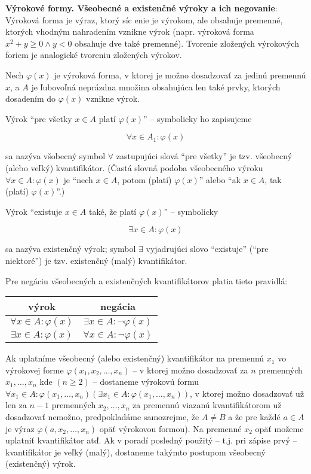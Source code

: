\textbf{Výrokové formy. Všeobecné a existenčné výroky a ich negovanie}:
Výroková forma je výraz, ktorý síc enie je výrokom, ale obsahuje premenné,
ktorých vhodným nahradením vznikne výrok (napr. výroková forma $x^2 + y \geq 0
\land y < 0$ obsahuje dve také premenné). Tvorenie zložených výrokových foriem
je analogické tvoreniu zložených výrokov.

Nech $\varphi (x)$ je výroková forma, v ktorej je možno dosadzovať za jedinú
premennú $x$, a $A$ je ľubovoľná neprázdna množina obsahujúca len také prvky,
ktorých dosadením do $\varphi (x)$ vznikne výrok.

Výrok \enquote{pre všetky $x \in A$ platí $\varphi (x)$} -- symbolicky ho zapisujeme

$$\forall x \in A_1: \varphi (x)$$

sa nazýva všobecný symbol $\forall$ zastupujúci slová \enquote{pre všetky} je
tzv. všeobecný (alebo veľký) kvantifikátor. (Častá slovná podoba všeobecného
výroku $\forall x \in A : \varphi (x)$ je \enquote{nech $x \in A$, potom
(platí) $\varphi (x)$} alebo \enquote{ak $x \in A$, tak (platí) $\varphi
(x)$}.)

Výrok \enquote{existuje $x \in A$ také, že platí $\varphi (x)$} -- symbolicky

$$\exists x \in A : \varphi (x)$$

sa nazýva existenčný výrok; symbol $\exists$ vyjadrujúci slovo
\enquote{existuje} (\enquote{pre niektoré}) je tzv. existenčný (malý)
kvantifikátor.

Pre negáciu všeobecných a existenčných kvantifikátorov platia tieto pravidlá:

\begin{center}
  \begin{tabular}{c | c}
    výrok & negácia \\
    \hline
    $\forall x \in A : \varphi (x)$ & $\exists x \in A : \neg \varphi (x)$ \\
    $\exists x \in A : \varphi (x)$ & $\forall x \in A : \neg \varphi (x)$ \\
  \end{tabular}
\end{center}

Ak uplatníme všeobecný (alebo existenčný) kvantifikátor na premennú $x_1$ vo
výrokovej forme $\varphi(x_1, x_2, \ldots, x_n)$ -- v ktorej možno dosadzovať za
$n$ premenných $x_1, \ldots, x_n$ kde $(n \geq 2)$ -- dostaneme výrokovú formu
$\forall x_1 \in A: \varphi (x_1, \ldots, x_n) (\exists x_1 \in A: \varphi
(x_1, \ldots, x_n))$, v ktorej možno dosadzovať už len za $n - 1$ premenných
$x_2, \ldots, x_n$ za premennú viazanú kvantifikátorom už dosadzovať nemožno,
predpokladáme samozrejme, že $A \neq B$ a že pre každé $a \in A$ je výraz
$\varphi (a, x_2, \ldots, x_n)$ opäť výrokovou formou). Na premenné $x_2$ opäť
možeme uplatniť kvantifikátor atď. Ak v poradí posledný použitý -- t.j. pri
zápise prvý -- kvantifikátor je veľký (malý), dostaneme takýmto postupom
všeobecný (existenčný) výrok.

